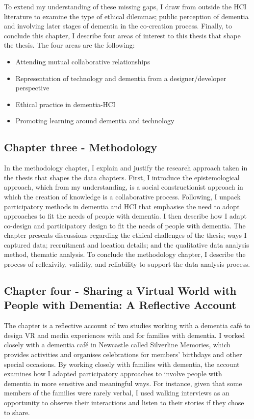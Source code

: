 To extend my understanding of these missing gaps, I draw from outside the HCI literature to examine the type of ethical dilemmas; public perception of dementia and involving later stages of dementia in the co-creation process. Finally, to conclude this chapter, I describe four areas of interest to this thesis that shape the thesis. The four areas are the following: 
\begin{itemize}
    \item Attending mutual collaborative relationships
    \item Representation of technology and dementia from a designer/developer perspective
    \item Ethical practice in dementia-HCI
    \item Promoting learning around dementia and technology
\end{itemize}

\subsection{Chapter three - Methodology}
\label{Intro:ChapterThree}
In the methodology chapter, I explain and justify the research approach taken in the thesis that shapes the data chapters. First, I introduce the epistemological approach, which from my understanding, is a social constructionist approach in which the creation of knowledge is a collaborative process. Following, I unpack participatory methods in dementia and HCI that emphasise the need to adopt approaches to fit the needs of people with dementia. I then describe how I adapt co-design and participatory design to fit the needs of people with dementia. The chapter presents discussions regarding the ethical challenges of the thesis; ways I captured data; recruitment and location details; and the qualitative data analysis method, thematic analysis. To conclude the methodology chapter, I describe the process of reflexivity, validity, and reliability to support the data analysis process. 

\subsection{Chapter four - Sharing a Virtual World with People with Dementia: A Reflective Account}
\label{Intro:ChapterFour}
The chapter is a reflective account of two studies working with a dementia café to design VR and media experiences with and for families with dementia. I worked closely with a dementia café in Newcastle called Silverline Memories, which provides activities and organises celebrations for members’ birthdays and other special occasions. By working closely with families with dementia, the account examines how I adapted participatory approaches to involve people with dementia in more sensitive and meaningful ways. For instance, given that some members of the families were rarely verbal, I used walking interviews as an opportunity to observe their interactions and listen to their stories if they chose to share. 

